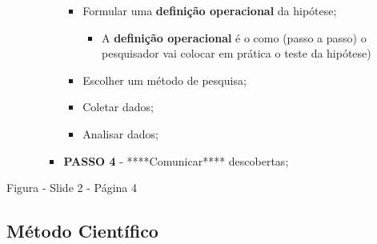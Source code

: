 \documentclass[
]{book}
\providecommand{\tightlist}{%
  \setlength{\itemsep}{0pt}\setlength{\parskip}{0pt}}
\begin{document}
\begin{itemize}
\begin{itemize}
\begin{itemize}
      \begin{itemize}
      \tightlist
      \item
        Formular uma \textbf{definição operacional} da hipótese;

        \begin{itemize}
        \tightlist
        \item
          A \textbf{definição operacional} é o como (passo a passo) o pesquisador vai colocar em prática o teste da hipótese)
        \end{itemize}
      \item
        Escolher um método de pesquisa;
      \item
        Coletar dados;
      \item
        Analisar dados;
      \end{itemize}
    \item
      \textbf{PASSO 4} - ****Comunicar**** descobertas;
    \end{itemize}
  \end{itemize}
\end{itemize}

Figura - Slide 2 - Página 4

\hypertarget{muxe9todo-cientuxedfico}{%
\subsection{Método Científico}\label{muxe9todo-cientuxedfico}}
\end{document}
